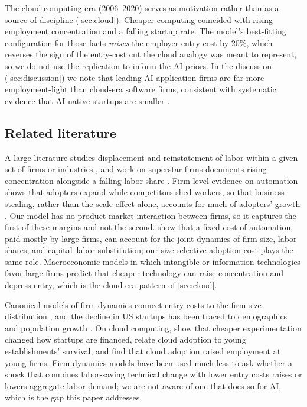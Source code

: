 The cloud-computing era (2006--2020) serves as motivation rather than as a source of discipline (\cref{sec:cloud}).
Cheaper computing coincided with rising employment concentration and a falling startup rate.
The model's best-fitting configuration for those facts \emph{raises} the employer entry cost by 20\%, which reverses the sign of the entry-cost cut the cloud analogy was meant to represent, so we do not use the replication to inform the AI priors.
In the discussion (\cref{sec:discussion}) we note that leading AI application firms are far more employment-light than cloud-era software firms, consistent with systematic evidence that AI-native startups are smaller \citep{kim2026ainative}.

\subsection{Related literature}\label{sec:intro-literature}

A large literature studies displacement and reinstatement of labor within a given set of firms or industries \citep{autor2003skill,autor2015why,acemoglu2018race}, and work on superstar firms documents rising concentration alongside a falling labor share \citep{autor2020fall}.
Firm-level evidence on automation shows that adopters expand while competitors shed workers, so that business stealing, rather than the scale effect alone, accounts for much of adopters' growth \citep{acemoglu2020competing,koch2021robots}.
Our model has no product-market interaction between firms, so it captures the first of these margins and not the second.
\citet{hubmer2021typical} show that a fixed cost of automation, paid mostly by large firms, can account for the joint dynamics of firm size, labor shares, and capital--labor substitution; our size-selective adoption cost plays the same role.
Macroeconomic models in which intangible or information technologies favor large firms \citep{deridder2024market,aghion2023falling} predict that cheaper technology can raise concentration and depress entry, which is the cloud-era pattern of \cref{sec:cloud}.

Canonical models of firm dynamics connect entry costs to the firm size distribution \citep{hopenhayn1992entry,luttmer2007selection}, and the decline in US startups has been traced to demographics and population growth \citep{karahan2024demographic,hopenhayn2022population}.
On cloud computing, \citet{ewens2018cost} show that cheaper experimentation changed how startups are financed, \citet{jin2017economies} relate cloud adoption to young establishments' survival, and \citet{destefano2023cloud} find that cloud adoption raised employment at young firms.
Firm-dynamics models have been used much less to ask whether a shock that combines labor-saving technical change with lower entry costs raises or lowers aggregate labor demand; we are not aware of one that does so for AI, which is the gap this paper addresses.

